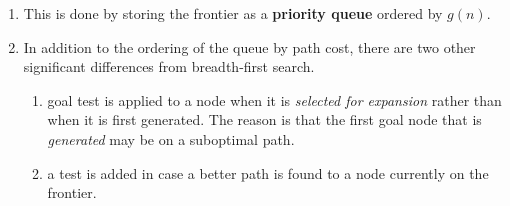 \begin{enumerate}
    \item  This is done by storing the frontier as a \textbf{priority queue} ordered by $g(n)$. 
    \hfill \cite{ai/book/Artificial-Intelligence-A-Modern-Approach/Russell-Norvig}

    \item In addition to the ordering of the queue by path cost, there are two other significant differences from breadth-first search.
    \hfill \cite{ai/book/Artificial-Intelligence-A-Modern-Approach/Russell-Norvig}
    \begin{enumerate}
        \item  goal test is applied to a node when it is \textit{selected for expansion} rather than when it is first generated.
        The reason is that the first goal node that is \textit{generated} may be on a suboptimal path.
        \hfill \cite{ai/book/Artificial-Intelligence-A-Modern-Approach/Russell-Norvig}

        \item a test is added in case a better path is found to a node currently on the frontier.
        \hfill \cite{ai/book/Artificial-Intelligence-A-Modern-Approach/Russell-Norvig}
    \end{enumerate}

\end{enumerate}

\vspace{0.5cm}



